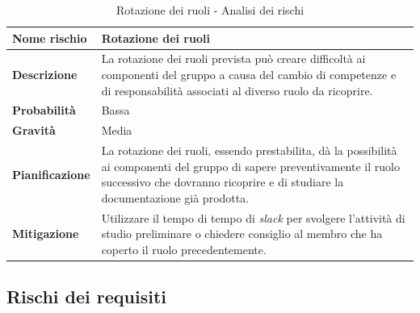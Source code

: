 \documentclass[12pt,a4paper]{article}
\begin{document}
\begin{table}[H]
	\begin{center}
		\begin{tabular}{p{} p{}}
			\toprule
			\textbf{Nome rischio} & \textbf{Rotazione dei ruoli} \\
			\midrule
			\midrule
			\textbf{Descrizione} & La rotazione dei ruoli prevista può creare difficoltà ai componenti del gruppo a causa del cambio
			di competenze e di responsabilità associati al diverso ruolo da ricoprire. \\
			\midrule
			\textbf{Probabilità} & Bassa \\
			\midrule
			\textbf{Gravità} & Media \\
			\midrule
			\textbf{Pianificazione} &  La rotazione dei ruoli, essendo prestabilita, dà la possibilità ai componenti del gruppo di sapere preventivamente il ruolo successivo che dovranno ricoprire e di studiare la documentazione già prodotta. \\
			\midrule
			\textbf{Mitigazione} & Utilizzare il tempo di tempo di \textit{slack} per svolgere l'attività di studio preliminare o chiedere consiglio al membro che ha coperto il ruolo precedentemente. \\
			\bottomrule
		\end{tabular}
		\caption{Rotazione dei ruoli - Analisi dei rischi}
	\end{center}
\end{table}

\subsection{Rischi dei requisiti}
\end{document}
